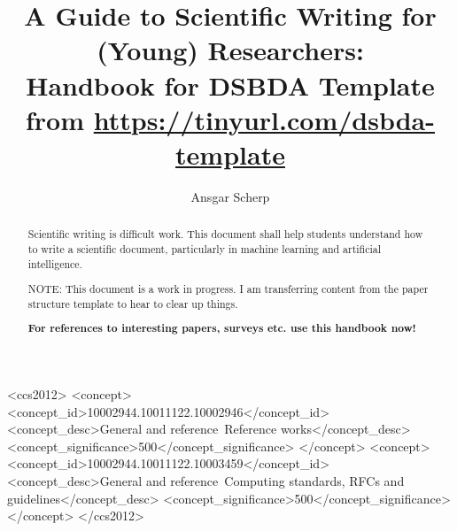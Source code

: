 \documentclass[manuscript, nonacm]{acmart}
\begin{document}
\title[Handbook]{A Guide to Scientific Writing for (Young) Researchers: \\
Handbook for DSBDA Template from 
\url{https://tinyurl.com/dsbda-template}
}


\author{Ansgar Scherp}


\begin{abstract}

\begin{tcolorbox}[title=\texttt{README.MD},colback=pink!20]

Scientific writing is difficult work.
This document shall help students understand how to write a scientific document, particularly in machine learning and artificial intelligence.


NOTE: This document is a work in progress. 
I am transferring content from the paper structure template to hear to clear up things.

\textbf{For references to interesting papers, surveys etc. use this handbook now!
}

\end{tcolorbox}
\end{abstract}


\begin{CCSXML}
<ccs2012>
   <concept>
       <concept_id>10002944.10011122.10002946</concept_id>
       <concept_desc>General and reference~Reference works</concept_desc>
       <concept_significance>500</concept_significance>
       </concept>
   <concept>
       <concept_id>10002944.10011122.10003459</concept_id>
       <concept_desc>General and reference~Computing standards, RFCs and guidelines</concept_desc>
       <concept_significance>500</concept_significance>
       </concept>
 </ccs2012>
\end{CCSXML}
\end{document}
